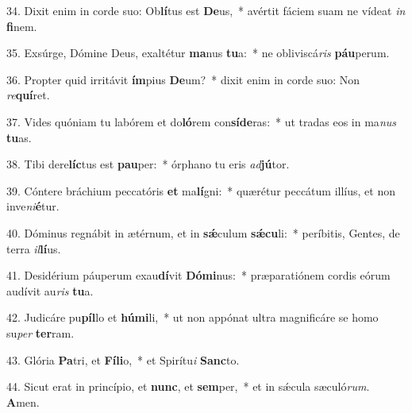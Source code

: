 34. Dixit enim in corde suo: Ob\textbf{lí}tus est \textbf{De}us,~*  avértit fáciem suam ne vídeat \textit{in} \textbf{fi}nem.\

35. Exsúrge, Dómine Deus, exaltétur \textbf{ma}nus \textbf{tu}a:~*  ne obliviscá\textit{ris} \textbf{páu}perum.\

36. Propter quid irritávit \textbf{ím}pius \textbf{De}um?~*  dixit enim in corde suo: Non \textit{re}\textbf{quí}ret.\

37. Vides quóniam tu labórem et do\textbf{ló}rem con\textbf{sí}\textbf{de}ras:~*  ut tradas eos in ma\textit{nus} \textbf{tu}as.\

38. Tibi dere\textbf{líc}tus est \textbf{pau}per:~*  órphano tu eris \textit{ad}\textbf{jú}tor.\

39. Cóntere bráchium peccatóris \textbf{et} ma\textbf{lí}gni:~*  quærétur peccátum illíus, et non inve\textit{ni}\textbf{é}tur.\

40. Dóminus regnábit in ætérnum, et in \textbf{sǽ}culum \textbf{sǽ}\textbf{cu}li:~*  períbitis, Gentes, de terra \textit{il}\textbf{lí}us.\

41. Desidérium páuperum exau\textbf{dí}vit \textbf{Dó}\textbf{mi}nus:~*  præparatiónem cordis eórum audívit au\textit{ris} \textbf{tu}a.\

42. Judicáre pu\textbf{píl}lo et \textbf{hú}\textbf{mi}li,~*  ut non appónat ultra magnificáre se homo su\textit{per} \textbf{ter}ram.\

43. Glória \textbf{Pa}tri, et \textbf{Fí}\textbf{li}o,~*  et Spirítu\textit{i} \textbf{Sanc}to.\

44. Sicut erat in princípio, et \textbf{nunc}, et \textbf{sem}per,~*  et in sǽcula sæculó\textit{rum}. \textbf{A}men.\

